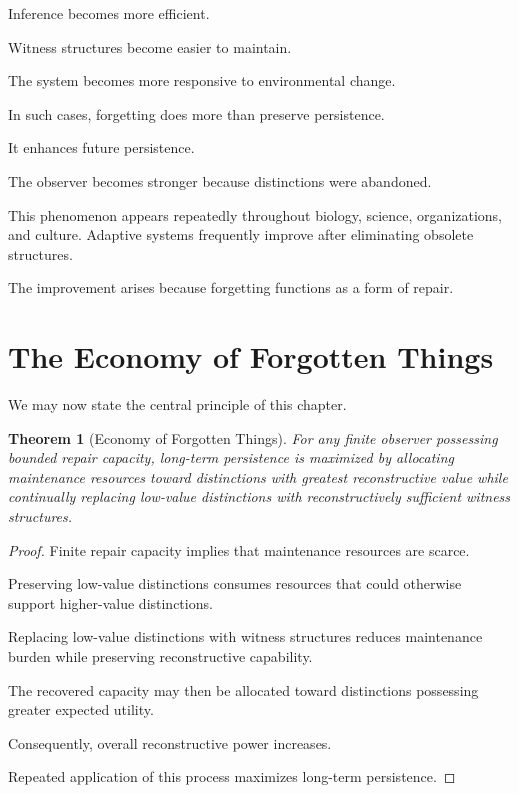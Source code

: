 \documentclass[12pt,oneside]{book}
\theoremstyle{plain} \newtheorem{theorem}{Theorem}[chapter] \newtheorem{lemma}[theorem]{Lemma} \newtheorem{proposition}[theorem]{Proposition} \newtheorem{corollary}[theorem]{Corollary}
\theoremstyle{definition} \newtheorem{definition}[theorem]{Definition} \newtheorem{axiom}[theorem]{Axiom} \newtheorem{construction}[theorem]{Construction}
\theoremstyle{remark} \newtheorem{remark}[theorem]{Remark} \newtheorem{example}[theorem]{Example}
\begin{document}
Inference becomes more efficient.

Witness structures become easier to maintain.

The system becomes more responsive to environmental change.

In such cases, forgetting does more than preserve persistence.

It enhances future persistence.

The observer becomes stronger because distinctions were abandoned.

This phenomenon appears repeatedly throughout biology, science, organizations, and culture. Adaptive systems frequently improve after eliminating obsolete structures.

The improvement arises because forgetting functions as a form of repair.

\section{The Economy of Forgotten Things}

We may now state the central principle of this chapter.

\begin{theorem}[Economy of Forgotten Things]

For any finite observer possessing bounded repair capacity, long-term persistence is maximized by allocating maintenance resources toward distinctions with greatest reconstructive value while continually replacing low-value distinctions with reconstructively sufficient witness structures.

\end{theorem}

\begin{proof}

Finite repair capacity implies that maintenance resources are scarce.

Preserving low-value distinctions consumes resources that could otherwise support higher-value distinctions.

Replacing low-value distinctions with witness structures reduces maintenance burden while preserving reconstructive capability.

The recovered capacity may then be allocated toward distinctions possessing greater expected utility.

Consequently, overall reconstructive power increases.

Repeated application of this process maximizes long-term persistence.

\end{proof}
\end{document}
